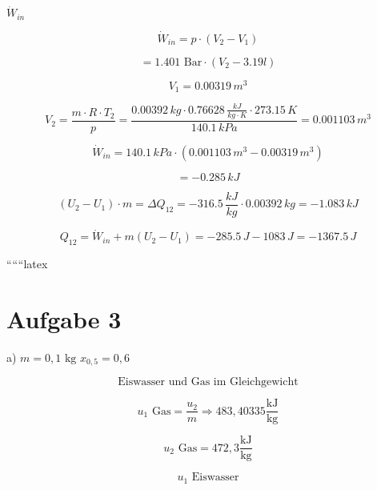 \textbf{$\dot{W}_{in}$} \quad {}

\begin{equation*}
\dot{W}_{in} = p \cdot (V_2 - V_1)
\end{equation*}

\begin{equation*}
= 1.401 \text{ Bar} \cdot (V_2 - 3.19 l)
\end{equation*}

\begin{equation*}
V_1 = 0.00319 \, m^3
\end{equation*}

\begin{equation*}
V_2 = \frac{m \cdot R \cdot T_2}{p} = \frac{0.00392 \, kg \cdot 0.76628 \, \frac{kJ}{kg \cdot K} \cdot 273.15 \, K}{140.1 \, kPa} = 0.001103 \, m^3
\end{equation*}

\begin{equation*}
\dot{W}_{in} = 140.1 \, kPa \cdot (0.001103 \, m^3 - 0.00319 \, m^3)
\end{equation*}

\begin{equation*}
= -0.285 \, kJ
\end{equation*}

\begin{equation*}
(U_2 - U_1) \cdot m = \Delta Q_{12} = -316.5 \, \frac{kJ}{kg} \cdot 0.00392 \, kg = -1.083 \, kJ
\end{equation*}

\begin{equation*}
Q_{12} = \dot{W}_{in} + m (U_2 - U_1) = -285.5 \, J - 1083 \, J = -1367.5 \, J
\end{equation*}

``````latex


\section*{Aufgabe 3}

a) $m = 0,1 \text{ kg}$ \hspace{1cm} $x_{0,5} = 0,6$

\[
\text{Eiswasser und Gas im Gleichgewicht}
\]

\[
u_1 \text{ Gas} = \frac{u_2}{m} \Rightarrow 483,40335 \frac{\text{kJ}}{\text{kg}}
\]

\[
u_2 \text{ Gas} = 472,3 \frac{\text{kJ}}{\text{kg}}
\]

\[
u_1 \text{ Eiswasser}
\]

